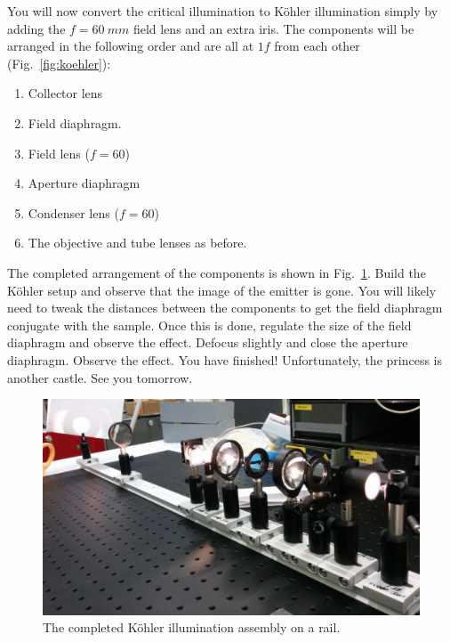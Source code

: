 \documentclass[a4paper]{report}
\begin{document}
\clearpage

You will now convert the critical illumination to K\"{o}hler illumination simply by adding the $f=60~mm$ field lens and an extra iris.
The components will be arranged in the following order and are all at $1f$ from each other (Fig.~\ref{fig:koehler}):
\begin{enumerate}
\setlength\itemsep{0.1em}
\item Collector lens
\item Field diaphragm.
\item Field lens ($f=60$)
\item Aperture diaphragm
\item Condenser lens ($f=60$)
\item The objective and tube lenses as before.
\end{enumerate}

The completed arrangement of the components is shown in Fig.~\ref{fig:koehler_completed}. 
Build the K\"{o}hler setup and observe that the image of the emitter is gone. 
You will likely need to tweak the distances between the components to get the field diaphragm conjugate with the sample. 
Once this is done, regulate the size of the field diaphragm and observe the effect. 
Defocus slightly and close the aperture diaphragm. Observe the effect.
You have finished! Unfortunately, the princess is another castle. See you tomorrow. 

\begin{figure}[h]
\center
\includegraphics[width=5.5in]{illum_complete.eps}
\caption{The completed K\"{o}hler illumination assembly on a rail.}
\label{fig:koehler_completed}
\end{figure}
\end{document}
